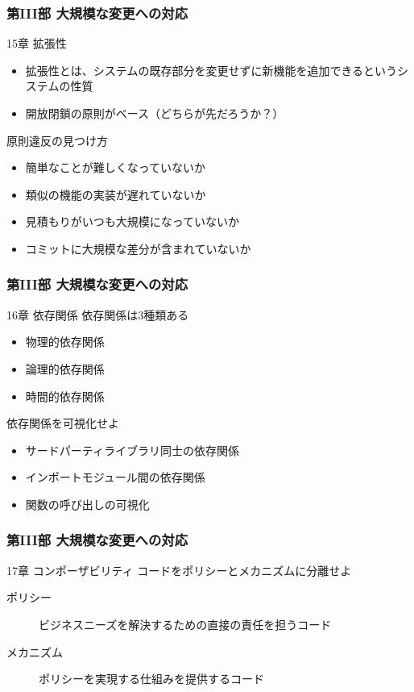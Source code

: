 \documentclass[aspectratio=169,dvipdfmx,12pt,notheorems]{beamer}
\theoremstyle{definition}
\begin{document}
\begin{frame}\frametitle{第III部 大規模な変更への対応}

\begin{block}{15章 拡張性}
\begin{itemize}
\item 拡張性とは、システムの既存部分を変更せずに新機能を追加できるというシステムの性質
\item 開放閉鎖の原則がベース（どちらが先だろうか？）
\end{itemize}
\end{block}

\begin{alertblock}{原則違反の見つけ方}
\begin{itemize}
\item 簡単なことが難しくなっていないか
\item 類似の機能の実装が遅れていないか
\item 見積もりがいつも大規模になっていないか
\item コミットに大規模な差分が含まれていないか
\end{itemize}
\end{alertblock}

\end{frame}

\begin{frame}\frametitle{第III部 大規模な変更への対応}

\begin{block}{16章 依存関係}
依存関係は3種類ある
\begin{itemize}
\item 物理的依存関係
\item 論理的依存関係
\item 時間的依存関係
\end{itemize}
\end{block}

\begin{exampleblock}{依存関係を可視化せよ}
\begin{itemize}
\item サードパーティライブラリ同士の依存関係
\item インポートモジュール間の依存関係
\item 関数の呼び出しの可視化
\end{itemize}
\end{exampleblock}

\end{frame}

\begin{frame}\frametitle{第III部 大規模な変更への対応}

\begin{block}{17章 コンポーザビリティ}
コードをポリシーとメカニズムに分離せよ
\begin{description}
\item[ポリシー] ビジネスニーズを解決するための直接の責任を担うコード
\item[メカニズム] ポリシーを実現する仕組みを提供するコード
\end{description}
\end{block}

\end{frame}
\end{document}

